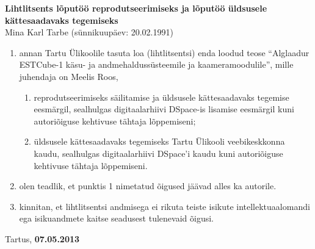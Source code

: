 \documentclass[12pt,a4paper]{article}
\begin{document}
\label{viited}



\pagebreak
\textbf{Lihtlitsents lõputöö reprodutseerimiseks ja lõputöö üldsusele
kättesaadavaks tegemiseks}\\

Mina Karl Tarbe (sünnikuupäev: 20.02.1991)
\begin{enumerate}
	\item
		annan Tartu Ülikoolile tasuta loa (lihtlitsentsi) enda loodud teose ``Alglaadur
		ESTCube-1 käsu- ja andmehaldussüsteemile ja kaameramoodulile'', mille juhendaja on
		Meelis Roos,
		\begin{enumerate}
			\item 
				reprodutseerimiseks säilitamise ja üldsusele kättesaadavaks
				tegemise eesmärgil, sealhulgas digitaalarhiivi DSpace-is
				lisamise eesmärgil kuni autoriõiguse kehtivuse tähtaja
				lõppemiseni;
			\item
				üldsusele kättesaadavaks tegemiseks Tartu Ülikooli
				veebikeskkonna kaudu, sealhulgas digitaalarhiivi DSpace'i kaudu
				kuni autoriõiguse kehtivuse tähtaja lõppemiseni.
		\end{enumerate}
	\item
		olen teadlik, et punktis 1 nimetatud õigused jäävad alles ka autorile.
	\item
		kinnitan, et lihtlitsentsi andmisega ei rikuta teiste isikute
		intellektuaalomandi ega isikuandmete kaitse seadusest tulenevaid õigusi.
\end{enumerate}

Tartus, \textbf{07.05.2013}
\end{document}
